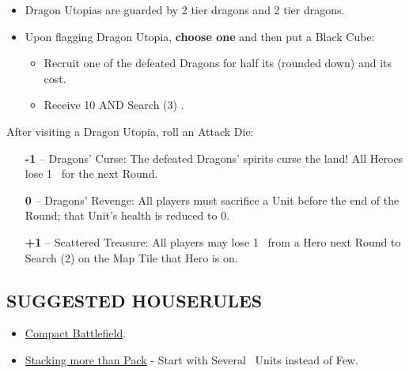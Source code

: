\begin{multicols*}{2}
\begin{itemize}
  \begin{itemize}
    \item Receive: 10 , 2 , and 1 
    \item Search (2)  twice
    \item Search (2)  twice
  \end{itemize}
  \item Dragon Utopias are guarded by 2 \azure\-tier dragons and 2 \golden\-tier dragons.
  \item Upon flagging Dragon Utopia, \textbf{choose one} and then put a Black Cube:
  \begin{itemize}
    \item Recruit one of the defeated Dragons for half its  (rounded down) and its  cost.
    \item Receive 10  AND Search (3) .
  \end{itemize}
\end{itemize}
After visiting a Dragon Utopia, roll an Attack Die:
\begin{itemize}
  \item[\textbf{-1}] -- Dragons' Curse: The defeated Dragons’ spirits curse the land! All Heroes lose \mbox{1 } for the next Round.
  \item[\textbf{0}] -- Dragons' Revenge: All players must sacrifice a Unit before the end of the Round; that Unit's health is reduced to 0.
  \item[ \textbf{+1}] -- Scattered Treasure: All players may lose \mbox{1 } from a Hero next Round to Search (2)  on the Map Tile that Hero is on.
\end{itemize}

\subsection*{\MakeUppercase{Suggested Houserules}}
\begin{itemize}
  \item \href{https://boardgamegeek.com/thread/3445901/custom-hex-combat-board}{Compact Battlefield}.
  \item \href{https://boardgamegeek.com/thread/3449937/houserule-for-stacking-more-than-pack}{Stacking more than Pack} - Start with Several \bronze\ Units instead of Few.
\end{itemize}

\vspace*{\fill}

\end{multicols*}

